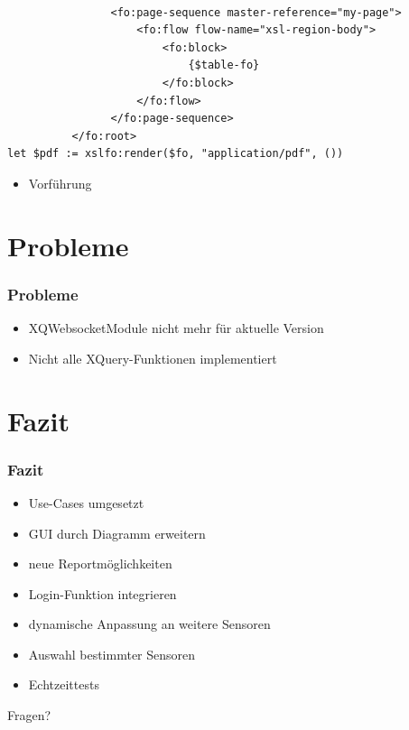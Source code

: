 \documentclass{beamer}
\begin{document}
\begin{frame}[fragile]
\begin{lstlisting}                
                
                <fo:page-sequence master-reference="my-page">
                    <fo:flow flow-name="xsl-region-body">
                        <fo:block>
                            {$table-fo}
                        </fo:block>
                    </fo:flow>
                </fo:page-sequence>
          </fo:root>
let $pdf := xslfo:render($fo, "application/pdf", ())
\end{lstlisting}
\end{frame}

\begin{frame}
\begin{itemize}
\item Vorführung
\end{itemize}
\end{frame}

\section{Probleme}
\begin{frame}
\frametitle{Probleme}
\begin{itemize}
	\item XQWebsocketModule nicht mehr für aktuelle Version
	\item Nicht alle XQuery-Funktionen implementiert
\end{itemize}
\end{frame}

\section{Fazit}
\begin{frame}
\frametitle{Fazit}
\begin{itemize}
	\item Use-Cases umgesetzt
	\item GUI durch Diagramm erweitern
	\item neue Reportmöglichkeiten
	\item Login-Funktion integrieren
	\item dynamische Anpassung an weitere Sensoren
	\item Auswahl bestimmter Sensoren
	\item Echtzeittests
\end{itemize}
\end{frame}

\begin{frame}
\begin{center}
\Huge Fragen?
\end{center}

\end{frame}
\end{document}
